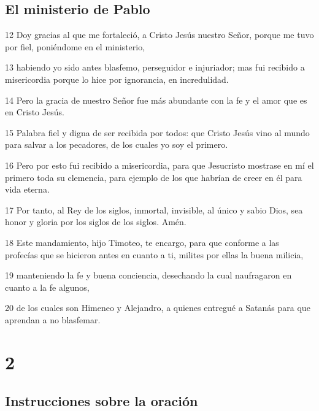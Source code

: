 \section*{El ministerio de Pablo}

\par 12 Doy gracias al que me fortaleció, a Cristo Jesús nuestro Señor, porque me tuvo por fiel, poniéndome en el ministerio,
\par 13 habiendo yo sido antes blasfemo, perseguidor e injuriador; mas fui recibido a misericordia porque lo hice por ignorancia, en incredulidad.
\par 14 Pero la gracia de nuestro Señor fue más abundante con la fe y el amor que es en Cristo Jesús.
\par 15 Palabra fiel y digna de ser recibida por todos: que Cristo Jesús vino al mundo para salvar a los pecadores, de los cuales yo soy el primero.
\par 16 Pero por esto fui recibido a misericordia, para que Jesucristo mostrase en mí el primero toda su clemencia, para ejemplo de los que habrían de creer en él para vida eterna.
\par 17 Por tanto, al Rey de los siglos, inmortal, invisible, al único y sabio Dios, sea honor y gloria por los siglos de los siglos. Amén.
\par 18 Este mandamiento, hijo Timoteo, te encargo, para que conforme a las profecías que se hicieron antes en cuanto a ti, milites por ellas la buena milicia,
\par 19 manteniendo la fe y buena conciencia, desechando la cual naufragaron en cuanto a la fe algunos,
\par 20 de los cuales son Himeneo y Alejandro, a quienes entregué a Satanás para que aprendan a no blasfemar.

\chapter{2}

\section*{Instrucciones sobre la oración}

